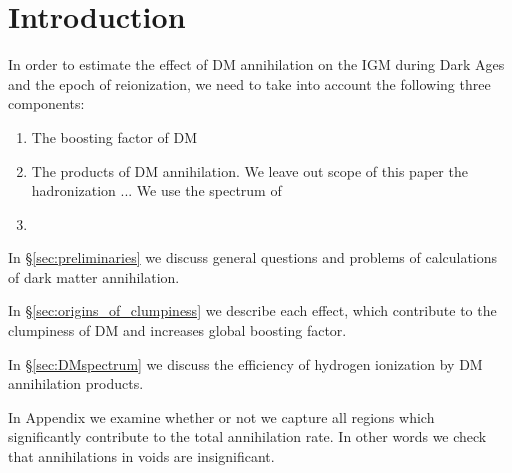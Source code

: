 \section{Introduction}

In order to estimate the effect of DM annihilation on the IGM during Dark Ages and the epoch of reionization, we need to take into account the following three components:
\begin{enumerate}
\item The boosting factor of DM  
\item The products of DM annihilation. We leave out scope of this paper the hadronization ... We use the spectrum of 
\item
\end{enumerate}
In \S\ref{sec:preliminaries} we discuss general questions and problems of calculations of dark matter annihilation.

In \S\ref{sec:origins_of_clumpiness} we describe each effect, which contribute to the clumpiness of DM and increases global boosting factor.

In \S\ref{sec:DMspectrum} we discuss the efficiency of hydrogen ionization by DM annihilation products.

In Appendix we examine whether or not we capture all regions which significantly contribute to the total annihilation rate. In other words we check that annihilations in voids are insignificant.
